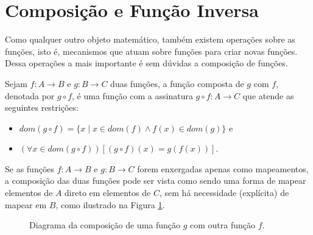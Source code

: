 \section{Composição e Função Inversa}\label{sec:FuncaoInversa}

Como qualquer outro objeto matemático, também existem operações sobre as funções, isto é, mecanismos que atuam sobre funções para criar novas funções. Dessa operações a mais importante é sem dúvidas a composição de funções.

\begin{definicao}\label{def:ComposicaoFuncional}
	Sejam $f: A \rightarrow B$ e $g: B \rightarrow C$ duas funções, a função composta de $g$ com $f$, denotada por $g \circ f$, é uma função com a assinatura $g \circ f: A \rightarrow C$ que atende as seguintes restrições:
	\begin{itemize}
		\item $dom(g \circ f) = \{x \mid x \in dom(f) \land f(x) \in dom(g)\}$ e 
		\item $(\forall x \in dom(g \circ f))[(g \circ f)(x) = g(f(x))]$.
	\end{itemize}
\end{definicao}

Se as funções $f: A \rightarrow B$ e $g: B \rightarrow C$ forem enxergadas apenas como mapeamentos, a composição  das duas funções pode ser vista como sendo uma forma de mapear elementos de $A$ direto em elementos de $C$, sem há necessidade (explícita) de mapear em $B$, como ilustrado na Figura \ref{fig:FuncaoComposta}.

\begin{figure}[H]
	\centering
	\caption{Diagrama da composição de uma função $g$ com outra função $f$.}
	\label{fig:FuncaoComposta}	
\end{figure}

